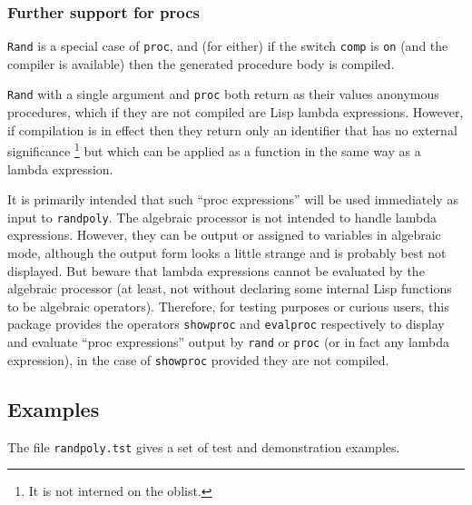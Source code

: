 \subsubsection{Further support for procs}

{\tt Rand} is a special case of {\tt proc}, and (for either) if the
switch {\tt comp} is {\tt on} (and the compiler is available) then the
generated procedure body is compiled.

{\tt Rand} with a single argument and {\tt proc} both return as their
values anonymous procedures, which if they are not compiled are Lisp
lambda expressions.  However, if compilation is in effect then they
return only an identifier that has no external significance%
\footnote{It is not interned on the oblist.} %
but which can be applied as a function in the same way as a lambda
expression.

It is primarily intended that such ``proc expressions'' will be used
immediately as input to {\tt randpoly}.  The algebraic processor is
not intended to handle lambda expressions.  However, they can be
output or assigned to variables in algebraic mode, although the output
form looks a little strange and is probably best not displayed.  But
beware that lambda expressions cannot be evaluated by the algebraic
processor (at least, not without declaring some internal Lisp
functions to be algebraic operators).  Therefore, for testing purposes
or curious users, this package provides the operators {\tt showproc}
and {\tt evalproc} respectively to display and evaluate ``proc
expressions'' output by {\tt rand} or {\tt proc} (or in fact any
lambda expression), in the case of {\tt showproc} provided they are
not compiled.


\subsection{Examples}
\label{randpolysec:Examples}

The file {\tt randpoly.tst} gives a set of test and demonstration
examples.

